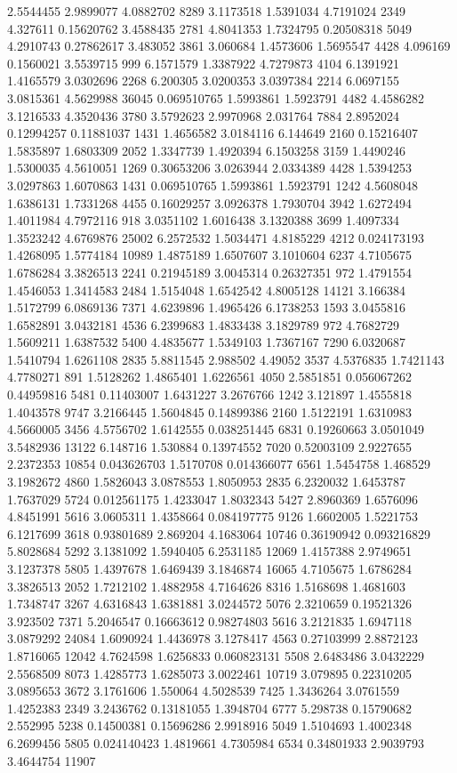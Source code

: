 2.5544455 2.9899077 4.0882702 8289
3.1173518 1.5391034 4.7191024 2349
4.327611 0.15620762 3.4588435 2781
4.8041353 1.7324795 0.20508318 5049
4.2910743 0.27862617 3.483052 3861
3.060684 1.4573606 1.5695547 4428
4.096169 0.1560021 3.5539715 999
6.1571579 1.3387922 4.7279873 4104
6.1391921 1.4165579 3.0302696 2268
6.200305 3.0200353 3.0397384 2214
6.0697155 3.0815361 4.5629988 36045
0.069510765 1.5993861 1.5923791 4482
4.4586282 3.1216533 4.3520436 3780
3.5792623 2.9970968 2.031764 7884
2.8952024 0.12994257 0.11881037 1431
1.4656582 3.0184116 6.144649 2160
0.15216407 1.5835897 1.6803309 2052
1.3347739 1.4920394 6.1503258 3159
1.4490246 1.5300035 4.5610051 1269
0.30653206 3.0263944 2.0334389 4428
1.5394253 3.0297863 1.6070863 1431
0.069510765 1.5993861 1.5923791 1242
4.5608048 1.6386131 1.7331268 4455
0.16029257 3.0926378 1.7930704 3942
1.6272494 1.4011984 4.7972116 918
3.0351102 1.6016438 3.1320388 3699
1.4097334 1.3523242 4.6769876 25002
6.2572532 1.5034471 4.8185229 4212
0.024173193 1.4268095 1.5774184 10989
1.4875189 1.6507607 3.1010604 6237
4.7105675 1.6786284 3.3826513 2241
0.21945189 3.0045314 0.26327351 972
1.4791554 1.4546053 1.3414583 2484
1.5154048 1.6542542 4.8005128 14121
3.166384 1.5172799 6.0869136 7371
4.6239896 1.4965426 6.1738253 1593
3.0455816 1.6582891 3.0432181 4536
6.2399683 1.4833438 3.1829789 972
4.7682729 1.5609211 1.6387532 5400
4.4835677 1.5349103 1.7367167 7290
6.0320687 1.5410794 1.6261108 2835
5.8811545 2.988502 4.49052 3537
4.5376835 1.7421143 4.7780271 891
1.5128262 1.4865401 1.6226561 4050
2.5851851 0.056067262 0.44959816 5481
0.11403007 1.6431227 3.2676766 1242
3.121897 1.4555818 1.4043578 9747
3.2166445 1.5604845 0.14899386 2160
1.5122191 1.6310983 4.5660005 3456
4.5756702 1.6142555 0.038251445 6831
0.19260663 3.0501049 3.5482936 13122
6.148716 1.530884 0.13974552 7020
0.52003109 2.9227655 2.2372353 10854
0.043626703 1.5170708 0.014366077 6561
1.5454758 1.468529 3.1982672 4860
1.5826043 3.0878553 1.8050953 2835
6.2320032 1.6453787 1.7637029 5724
0.012561175 1.4233047 1.8032343 5427
2.8960369 1.6576096 4.8451991 5616
3.0605311 1.4358664 0.084197775 9126
1.6602005 1.5221753 6.1217699 3618
0.93801689 2.869204 4.1683064 10746
0.36190942 0.093216829 5.8028684 5292
3.1381092 1.5940405 6.2531185 12069
1.4157388 2.9749651 3.1237378 5805
1.4397678 1.6469439 3.1846874 16065
4.7105675 1.6786284 3.3826513 2052
1.7212102 1.4882958 4.7164626 8316
1.5168698 1.4681603 1.7348747 3267
4.6316843 1.6381881 3.0244572 5076
2.3210659 0.19521326 3.923502 7371
5.2046547 0.16663612 0.98274803 5616
3.2121835 1.6947118 3.0879292 24084
1.6090924 1.4436978 3.1278417 4563
0.27103999 2.8872123 1.8716065 12042
4.7624598 1.6256833 0.060823131 5508
2.6483486 3.0432229 2.5568509 8073
1.4285773 1.6285073 3.0022461 10719
3.079895 0.22310205 3.0895653 3672
3.1761606 1.550064 4.5028539 7425
1.3436264 3.0761559 1.4252383 2349
3.2436762 0.13181055 1.3948704 6777
5.298738 0.15790682 2.552995 5238
0.14500381 0.15696286 2.9918916 5049
1.5104693 1.4002348 6.2699456 5805
0.024140423 1.4819661 4.7305984 6534
0.34801933 2.9039793 3.4644754 11907

